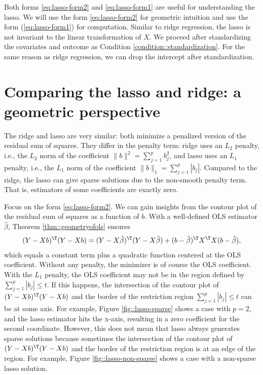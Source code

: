 Both forms \eqref{eq:lasso-form2} and \eqref{eq:lasso-form1} are useful for understanding the lasso. 
We will use the form \eqref{eq:lasso-form2} for geometric intuition and use the form (\ref{eq:lasso-form1}) for computation. Similar to
ridge regression, the lasso is not invariant to the linear transformation
of $X$. We proceed after standardizing the covariates and outcome as Condition \ref{condition::standardization}. For the same reason as ridge regression, we can drop the intercept after standardization. 




\section{Comparing the lasso and ridge: a geometric perspective}


The ridge and lasso are very similar: both minimize a penalized version of the residual sum of squares. They differ in the penalty term: ridge uses an $L_2$ penalty, i.e., the $L_2$ norm of the coefficient $ \| b\|^2 =  \sum_{j=1}^p b_j^2$, and lasso uses an $L_1$ penalty, i.e., the $L_1$ norm of the coefficient   $\| b\|_1 = \sum_{j=1}^p | b_j |$. Compared to the ridge, the lasso can give sparse solutions due to the non-smooth penalty term. That is, estimators of some coefficients are exactly zero. 


Focus on the form \eqref{eq:lasso-form2}.  We can gain insights from the contour plot of the residual sum of squares as a function of $b$. With a well-defined OLS estimator $\hat{\beta}$, Theorem \ref{thm::geometryofols} ensures 
\begin{align*}
(Y-Xb)^{\T}(Y-Xb)  =(Y-X\hat{\beta})^{\T}(Y-X\hat{\beta})
  +(b-\hat{\beta})^{\T}X^{\T}X(b-\hat{\beta}),
\end{align*}
which equals a constant term plus a quadratic function centered at the OLS coefficient. Without any penalty, the minimizer is of course the OLS coefficient. With the $L_1$ penalty, the OLS coefficient may not be in the region defined by $\sum_{j=1}^{p}|b_{j}| \leq t$. If this happens, the intersection of the contour plot of $(Y-Xb)^{\T}(Y-Xb)$ and the border of the restriction region $\sum_{j=1}^{p}|b_{j}| \leq t$ can be at some axis. For example, Figure \ref{fig::lasso-sparse} shows a case with $p=2$, and the lasso estimator hits the x-axis, resulting in a zero coefficient for the second coordinate. However, this does not mean that lasso always generates sparse solutions because sometimes the intersection of the contour plot of $(Y-Xb)^{\T}(Y-Xb)$ and the border of the restriction region is at an edge of the region. For example, Figure \ref{fig::lasso-non-sparse} shows a case with a non-sparse lasso solution. 



